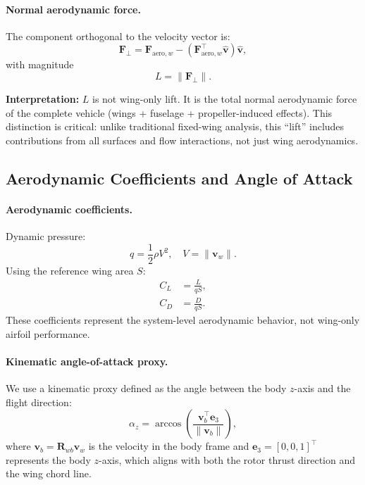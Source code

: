 \paragraph{Normal aerodynamic force.}
The component orthogonal to the velocity vector is:
\begin{equation}
\mathbf{F}_\perp = \mathbf{F}_{\text{aero},w} - (\mathbf{F}_{\text{aero},w}^\top \hat{\mathbf{v}}) \hat{\mathbf{v}},
\label{eq:normal_force_vector}
\end{equation}
with magnitude
\begin{equation}
L = \|\mathbf{F}_\perp\|.
\label{eq:normal_force_magnitude}
\end{equation}

\textbf{Interpretation:}
$L$ is not wing-only lift.
It is the total normal aerodynamic force of the complete vehicle (wings + fuselage + propeller-induced effects).
This distinction is critical: unlike traditional fixed-wing analysis, this ``lift'' includes contributions from all surfaces and flow interactions, not just wing aerodynamics.

\subsection{Aerodynamic Coefficients and Angle of Attack}\label{sec:coeffs-aoa-full}

\paragraph{Aerodynamic coefficients.}
Dynamic pressure:
\begin{equation}
q = \frac{1}{2}\rho V^2, \quad V = \|\mathbf{v}_w\|.
\label{eq:dynamic_pressure_full}
\end{equation}
Using the reference wing area $S$:
\begin{align}
C_L &= \frac{L}{qS}, \label{eq:CL_velocity_based} \\
C_D &= \frac{D}{qS}. \label{eq:CD_velocity_based}
\end{align}
These coefficients represent the system-level aerodynamic behavior, not wing-only airfoil performance.

\paragraph{Kinematic angle-of-attack proxy.}
We use a kinematic proxy defined as the angle between the body $z$-axis and the flight direction:
\begin{equation}
\alpha_z = \arccos\left(\frac{\mathbf{v}_b^\top \mathbf{e}_3}{\|\mathbf{v}_b\|}\right),
\label{eq:alpha_z_proxy}
\end{equation}
where $\mathbf{v}_b = \mathbf{R}_{wb} \mathbf{v}_w$ is the velocity in the body frame and $\mathbf{e}_3 = [0, 0, 1]^\top$ represents the body $z$-axis, which aligns with both the rotor thrust direction and the wing chord line.


